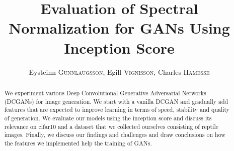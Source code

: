 \documentclass[runningheads]{llncs}
\begin{document}
\pagestyle{headings}
\mainmatter

%
\def\ECCV16SubNumber{16}
\def\GroupNumber{16}
\title{Evaluation of Spectral Normalization for GANs Using Inception Score}
\author{Eysteinn \textsc{Gunnlaugsson},
	Egill \textsc{Vignisson},
	Charles \textsc{Hamesse}}
\institute{Group \GroupNumber}
\maketitle

%
\begin{abstract} We experiment various Deep Convolutional Generative Adversarial Networks (DCGANs) for image generation. We start with a vanilla DCGAN and gradually add features that are expected to improve learning in terms of speed, stability and quality of generation. We evaluate our models using the inception score and discuss its relevance on cifar10 and a dataset that we collected ourselves consisting of reptile images. Finally, we discuss our findings and challenges and draw conclusions on how the features we implemented help the training of GANs.
{}
\end{abstract}

%






%






\end{document}
